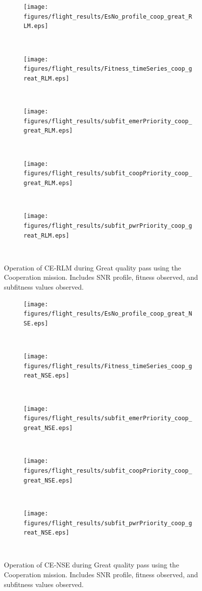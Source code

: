 \begin{figure}[ht!]
\centering
\begin{subfigure}{\linewidth}
	\centering
	\texttt{[image: figures/flight\_results/EsNo\_profile\_coop\_great\_RLM.eps]}
\end{subfigure}\\
\begin{subfigure}{\linewidth}
	\centering
	\texttt{[image: figures/flight\_results/Fitness\_timeSeries\_coop\_great\_RLM.eps]}
\end{subfigure}\\
\begin{subfigure}{\linewidth}
	\centering
	\texttt{[image: figures/flight\_results/subfit\_emerPriority\_coop\_great\_RLM.eps]}
\end{subfigure}\\
\begin{subfigure}{\linewidth}
	\centering
	\texttt{[image: figures/flight\_results/subfit\_coopPriority\_coop\_great\_RLM.eps]}
	
\end{subfigure}\\
\begin{subfigure}{\linewidth}
	\centering
	\texttt{[image: figures/flight\_results/subfit\_pwrPriority\_coop\_great\_RLM.eps]}
\end{subfigure}\\
\caption{Operation of CE-RLM during Great quality pass using the Cooperation mission. Includes SNR profile, fitness observed, and subfitness values observed.}\label{fig:flight_rlm_coop_great_overview}
\end{figure}
\begin{figure}[ht!]
\centering
\begin{subfigure}{\linewidth}
	\centering
	\texttt{[image: figures/flight\_results/EsNo\_profile\_coop\_great\_NSE.eps]}
\end{subfigure}\\
\begin{subfigure}{\linewidth}
	\centering
	\texttt{[image: figures/flight\_results/Fitness\_timeSeries\_coop\_great\_NSE.eps]}
\end{subfigure}\\
\begin{subfigure}{\linewidth}
	\centering
	\texttt{[image: figures/flight\_results/subfit\_emerPriority\_coop\_great\_NSE.eps]}
\end{subfigure}\\
\begin{subfigure}{\linewidth}
	\centering
	\texttt{[image: figures/flight\_results/subfit\_coopPriority\_coop\_great\_NSE.eps]}
	
\end{subfigure}\\
\begin{subfigure}{\linewidth}
	\centering
	\texttt{[image: figures/flight\_results/subfit\_pwrPriority\_coop\_great\_NSE.eps]}
\end{subfigure}\\
\caption{Operation of CE-NSE during Great quality pass using the Cooperation mission. Includes SNR profile, fitness observed, and subfitness values observed.}\label{fig:flight_nse_coop_great_overview}
\end{figure}
